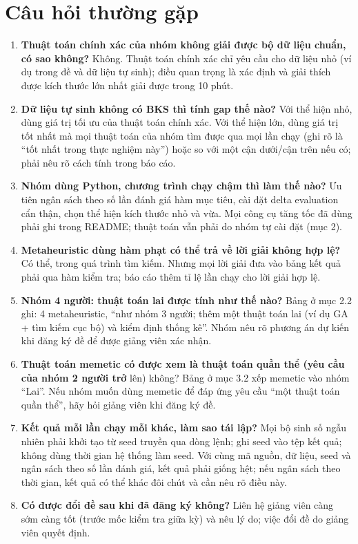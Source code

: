 \documentclass[a4paper,11pt]{article}
\begin{document}
\section{Câu hỏi thường gặp}
\begin{enumerate}[leftmargin=2em,itemsep=0.5em]
\item \textbf{Thuật toán chính xác của nhóm không giải được bộ dữ liệu chuẩn, có sao không?} Không. Thuật toán chính xác chỉ yêu cầu cho dữ liệu nhỏ (ví dụ trong đề và dữ liệu tự sinh); điều quan trọng là xác định và giải thích được kích thước lớn nhất giải được trong 10 phút.
\item \textbf{Dữ liệu tự sinh không có BKS thì tính gap thế nào?} Với thể hiện nhỏ, dùng giá trị tối ưu của thuật toán chính xác. Với thể hiện lớn, dùng giá trị tốt nhất mà mọi thuật toán của nhóm tìm được qua mọi lần chạy (ghi rõ là “tốt nhất trong thực nghiệm này”) hoặc so với một cận dưới/cận trên nếu có; phải nêu rõ cách tính trong báo cáo.
\item \textbf{Nhóm dùng Python, chương trình chạy chậm thì làm thế nào?} Ưu tiên ngân sách theo số lần đánh giá hàm mục tiêu, cài đặt delta evaluation cẩn thận, chọn thể hiện kích thước nhỏ và vừa. Mọi công cụ tăng tốc đã dùng phải ghi trong README; thuật toán vẫn phải do nhóm tự cài đặt (mục 2).
\item \textbf{Metaheuristic dùng hàm phạt có thể trả về lời giải không hợp lệ?} Có thể, trong quá trình tìm kiếm. Nhưng mọi lời giải đưa vào bảng kết quả phải qua hàm kiểm tra; báo cáo thêm tỉ lệ lần chạy cho lời giải hợp lệ.
\item \textbf{Nhóm 4 người: thuật toán lai được tính như thế nào?} Bảng ở mục 2.2 ghi: 4 metaheuristic, “như nhóm 3 người; thêm một thuật toán lai (ví dụ GA + tìm kiếm cục bộ) và kiểm định thống kê”. Nhóm nêu rõ phương án dự kiến khi đăng ký đề để được giảng viên xác nhận.
\item \textbf{Thuật toán memetic có được xem là thuật toán quần thể (yêu cầu của nhóm 2 người trở} lên) không? Bảng ở mục 3.2 xếp memetic vào nhóm “Lai”. Nếu nhóm muốn dùng memetic để đáp ứng yêu cầu “một thuật toán quần thể”, hãy hỏi giảng viên khi đăng ký đề.
\item \textbf{Kết quả mỗi lần chạy mỗi khác, làm sao tái lập?} Mọi bộ sinh số ngẫu nhiên phải khởi tạo từ seed truyền qua dòng lệnh; ghi seed vào tệp kết quả; không dùng thời gian hệ thống làm seed. Với cùng mã nguồn, dữ liệu, seed và ngân sách theo số lần đánh giá, kết quả phải giống hệt; nếu ngân sách theo thời gian, kết quả có thể khác đôi chút và cần nêu rõ điều này.
\item \textbf{Có được đổi đề sau khi đã đăng ký không?} Liên hệ giảng viên càng sớm càng tốt (trước mốc kiểm tra giữa kỳ) và nêu lý do; việc đổi đề do giảng viên quyết định.
\end{enumerate}
\end{document}
